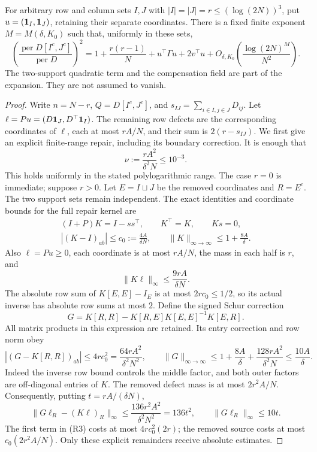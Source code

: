 \begin{theorem}
\label{thm:minorjet}
For arbitrary row and column sets \(I,J\) with
\(|I|=|J|=r\leq(\log(2N))^3\), put
\(u=(\mathbf1_I,\mathbf1_J)\), retaining their separate coordinates.
There is a fixed finite exponent \(M=M(\delta,K_0)\) such that,
uniformly in these sets,
\[
 \left(\frac{\operatorname{per}D[I^c,J^c]}
                   {\operatorname{per}D}\right)^2
 =1+\frac{r(r-1)}N+u^\top\Gamma u+2v^\top u
                         +O_{\delta,K_0}\left(
                              \frac{\log(2N)^M}{N^2}\right).
\]
The two-support quadratic term and the compensation field
are part of the expansion. They are not assumed to vanish.
\end{theorem}
\begin{proof}
Write \(n=N-r\), \(Q=D[I^c,J^c]\), and
\(s_{IJ}=\sum_{i\in I,j\in J}D_{ij}\).
Let \(\ell=Pu=(D\mathbf1_J,D^\top\mathbf1_I)\).
The remaining row defects are the corresponding coordinates
of \(\ell\), each at most \(rA/N\), and their sum is
\(2(r-s_{IJ})\).
We first give an explicit finite-range repair, including its
boundary correction. It is enough that
\[
 \nu:=\frac{rA^2}{\delta^2N}\leq10^{-3}.
 \tag{R1}
\]
This holds uniformly in the stated polylogarithmic range.
The case \(r=0\) is immediate; suppose \(r>0\).
Let \(E=I\sqcup J\) be the removed coordinates and \(R=E^c\).
The two support sets remain independent. The exact identities and
coordinate bounds for the full repair kernel are
\[
 \begin{gathered}
 (I+P)K=I-ss^\top,\qquad K^\top=K,\qquad Ks=0,\\
 |(K-I)_{ab}|\leq c_0:=\frac{4A}{\delta N},\qquad
 \|K\|_{\infty\to\infty}\leq1+\frac{8A}{\delta}.
 \end{gathered}
\]
Also \(\ell=Pu\geq0\), each coordinate is at most \(rA/N\),
the mass in each half is \(r\), and
\[
 \|K\ell\|_\infty\leq\frac{9rA}{\delta N}.
\]
The absolute row sum of \(K[E,E]-I_E\) is at most
\(2rc_0\leq1/2\), so its actual inverse has absolute row
sums at most \(2\). Define the signed Schur correction
\[
 G=K[R,R]-K[R,E]K[E,E]^{-1}K[E,R].
\]
All matrix products in this expression are retained.
Its entry correction and row norm obey
\[
 |(G-K[R,R])_{ab}|\leq4rc_0^2
       =\frac{64rA^2}{\delta^2N^2},\qquad
 \|G\|_{\infty\to\infty}
 \leq1+\frac{8A}{\delta}
       +\frac{128rA^2}{\delta^2N}\leq\frac{10A}{\delta}.
 \tag{R2}
\]
Indeed the inverse row bound controls the middle factor, and both
outer factors are off-diagonal entries of \(K\).
The removed defect mass is at most \(2r^2A/N\).
Consequently, putting \(t=rA/(\delta N)\),
\[
 \|G\ell_R-(K\ell)_R\|_\infty
 \leq\frac{136r^2A^2}{\delta^2N^2}=136t^2,\qquad
 \|G\ell_R\|_\infty\leq10t.
 \tag{R3}
\]
The first term in (R3) costs at most \(4rc_0^2(2r)\);
the removed source costs at most \(c_0(2r^2A/N)\).
Only these explicit remainders receive absolute estimates.


\end{proof}
